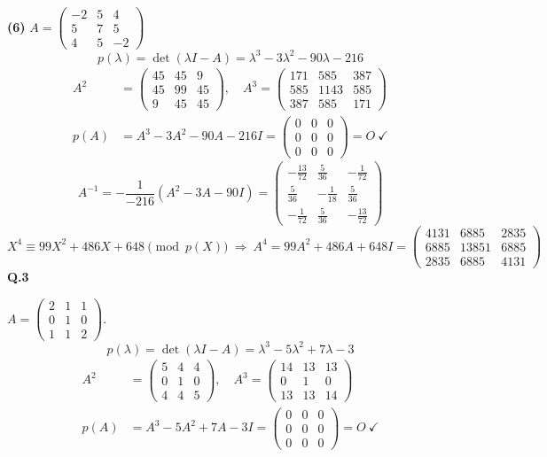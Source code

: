 \noindent\textbf{(6)} $A=\begin{pmatrix}-2 & 5 & 4 \\ 5 & 7 & 5 \\ 4 & 5 & -2\end{pmatrix}$
\[ p(\lambda)=\det(\lambda I-A)=\lambda^{3} - 3 \lambda^{2} - 90 \lambda - 216 \]
\begin{align*}
A^2&=\begin{pmatrix}45 & 45 & 9 \\ 45 & 99 & 45 \\ 9 & 45 & 45\end{pmatrix},\quad A^3=\begin{pmatrix}171 & 585 & 387 \\ 585 & 1143 & 585 \\ 387 & 585 & 171\end{pmatrix} \\
p(A)&=A^{3} - 3A^{2} - 90A - 216I=\begin{pmatrix}0 & 0 & 0 \\ 0 & 0 & 0 \\ 0 & 0 & 0\end{pmatrix}=O\ \checkmark
\end{align*}
\[ A^{-1}=-\frac{1}{-216}\left(A^{2} -3A -90I\right)=\begin{pmatrix}- \frac{13}{72} & \frac{5}{36} & - \frac{1}{72} \\ \frac{5}{36} & - \frac{1}{18} & \frac{5}{36} \\ - \frac{1}{72} & \frac{5}{36} & - \frac{13}{72}\end{pmatrix} \]
\[ X^4\equiv 99 X^{2} + 486 X + 648\pmod{p(X)}\ \Rightarrow\ A^4=99A^{2} + 486A + 648I=\begin{pmatrix}4131 & 6885 & 2835 \\ 6885 & 13851 & 6885 \\ 2835 & 6885 & 4131\end{pmatrix} \]
\medskip\noindent\textbf{Q.3}\par\smallskip
$A=\begin{pmatrix}2 & 1 & 1 \\ 0 & 1 & 0 \\ 1 & 1 & 2\end{pmatrix}$.
\[ p(\lambda)=\det(\lambda I-A)=\lambda^{3} - 5 \lambda^{2} + 7 \lambda - 3 \]
\begin{align*}
A^2&=\begin{pmatrix}5 & 4 & 4 \\ 0 & 1 & 0 \\ 4 & 4 & 5\end{pmatrix},\quad A^3=\begin{pmatrix}14 & 13 & 13 \\ 0 & 1 & 0 \\ 13 & 13 & 14\end{pmatrix} \\
p(A)&=A^{3} - 5A^{2} + 7A - 3I=\begin{pmatrix}0 & 0 & 0 \\ 0 & 0 & 0 \\ 0 & 0 & 0\end{pmatrix}=O\ \checkmark
\end{align*}
